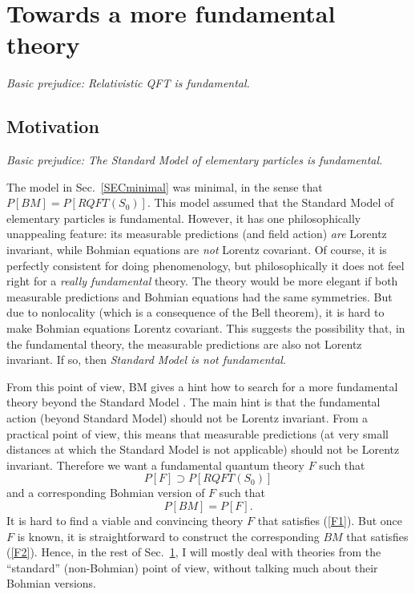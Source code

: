 \documentclass[12pt]{article}
\begin{document}
\section{Towards a more fundamental theory}
\label{SECmoref}

\begin{flushright}
{\it Basic prejudice: Relativistic QFT is fundamental.}
\end{flushright}

\subsection{Motivation}

\begin{flushright}
{\it Basic prejudice: The Standard Model of elementary particles is fundamental.} 
\end{flushright}

The model in Sec.~\ref{SECminimal} was minimal, in the sense that $P[BM] = P[RQFT(S_0)]$. 
This model assumed that the Standard Model of elementary particles \cite{chengli,schwartz} is fundamental.
However, it has one philosophically unappealing feature: 
its measurable predictions (and field action) {\em are} Lorentz invariant, while 
Bohmian equations are {\em not} Lorentz covariant. 
Of course, it is perfectly consistent for doing phenomenology, but philosophically it does not feel right 
for a {\em really fundamental} theory. 
The theory would be more elegant if both measurable predictions and Bohmian equations 
had the same symmetries. But due to nonlocality (which is a consequence of the Bell theorem), it is hard to make  
Bohmian equations Lorentz covariant. 
This suggests the possibility that, in the fundamental theory, the measurable predictions are also not Lorentz invariant. 
If so, then {\em Standard Model is not fundamental}.

From this point of view, BM gives a hint how to search for a more fundamental theory 
beyond the Standard Model \cite{nikIBM}. 
The main hint is that the fundamental action (beyond Standard Model) should not be Lorentz invariant. 
From a practical point of view, this means that measurable predictions (at very small distances at which
the Standard Model is not applicable) should not be Lorentz invariant.
Therefore we want a fundamental quantum theory $F$ such that
\begin{equation}\label{F1}
 P[F] \supset P[RQFT(S_0)] 
\end{equation}
and a corresponding Bohmian version of $F$ such that
\begin{equation}\label{F2}
 P[BM] = P[F] .
\end{equation}
It is hard to find a viable and convincing theory $F$ that satisfies (\ref{F1}).
But once $F$ is known, it is straightforward to construct the corresponding $BM$  that satisfies (\ref{F2}).  
Hence, in the rest of Sec.~\ref{SECmoref}, I will mostly deal with theories from the ``standard'' (non-Bohmian) 
point of view, without talking much about their Bohmian versions.  
 
\end{document}
